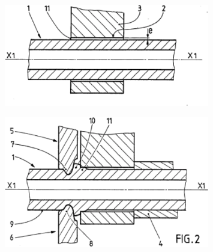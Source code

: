 \begin{figure}[ht!]
    \centering
    \includegraphics[width=0.8\textwidth]{fig_01.png}
    \caption{}
    \label{label_figure}
\end{figure}

\begin{figure}[ht!]
    \centering
    \includegraphics[width=0.8\textwidth]{fig_02.png}
    \caption{}
    \label{label_figure_bis}
\end{figure}

